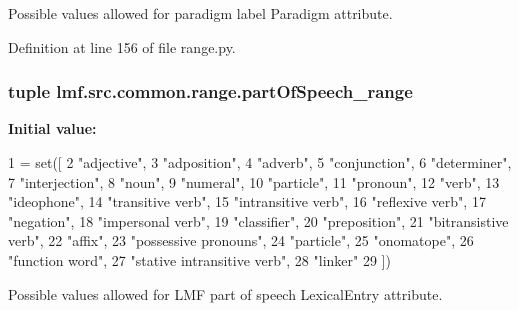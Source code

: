 Possible values allowed for paradigm label Paradigm attribute. 



Definition at line 156 of file range.\+py.

\hypertarget{namespacelmf_1_1src_1_1common_1_1range_a06c6dcbacac56dba9aaf04fa02b528e1}{
\subsubsection[{part\+Of\+Speech\+\_\+range}]{\setlength{\rightskip}{0pt plus 5cm}tuple lmf.\+src.\+common.\+range.\+part\+Of\+Speech\+\_\+range}}\label{namespacelmf_1_1src_1_1common_1_1range_a06c6dcbacac56dba9aaf04fa02b528e1}
{\bfseries Initial value\+:}
\begin{DoxyCode}
1 = set([
2     \textcolor{stringliteral}{"adjective"},
3     \textcolor{stringliteral}{"adposition"},
4     \textcolor{stringliteral}{"adverb"},
5     \textcolor{stringliteral}{"conjunction"},
6     \textcolor{stringliteral}{"determiner"},
7     \textcolor{stringliteral}{"interjection"},
8     \textcolor{stringliteral}{"noun"},
9     \textcolor{stringliteral}{"numeral"},
10     \textcolor{stringliteral}{"particle"},
11     \textcolor{stringliteral}{"pronoun"},
12     \textcolor{stringliteral}{"verb"},
13     \textcolor{stringliteral}{"ideophone"},
14     \textcolor{stringliteral}{"transitive verb"},
15     \textcolor{stringliteral}{"intransitive verb"},
16     \textcolor{stringliteral}{"reflexive verb"},
17     \textcolor{stringliteral}{"negation"},
18     \textcolor{stringliteral}{"impersonal verb"},
19     \textcolor{stringliteral}{"classifier"},
20     \textcolor{stringliteral}{"preposition"},
21     \textcolor{stringliteral}{"bitransistive verb"},
22     \textcolor{stringliteral}{"affix"},
23     \textcolor{stringliteral}{"possessive pronouns"},
24     \textcolor{stringliteral}{"particle"},
25     \textcolor{stringliteral}{"onomatope"},
26     \textcolor{stringliteral}{"function word"},
27     \textcolor{stringliteral}{"stative intransitive verb"},
28     \textcolor{stringliteral}{"linker"}
29 ])
\end{DoxyCode}


Possible values allowed for L\+M\+F part of speech Lexical\+Entry attribute. 



